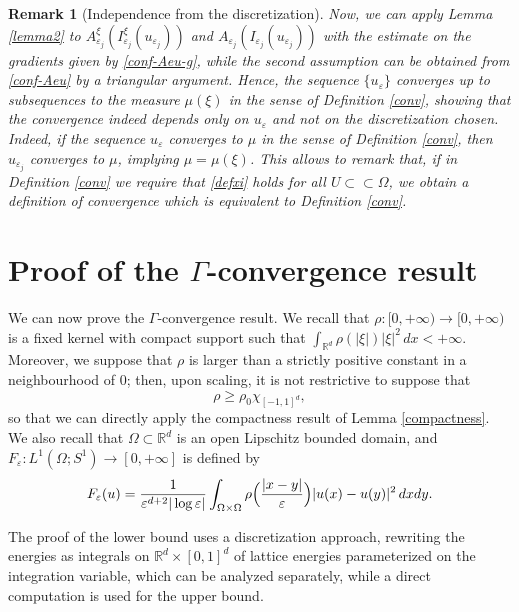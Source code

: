 \documentclass[11pt]{article}
\newtheorem{remark}[definition]{Remark}
\def\e{\varepsilon}
\def\dxy{\,dx dy}
\begin{document}
\begin{remark}[Independence from the discretization]
Now, we can apply Lemma \ref{lemma2} to $A^\xi_{\e_j}(I_{\e_j}^\xi(u_{\e_j}))$ and $A_{\e_j}(I_{\e_j}(u_{\e_j}))$ with the estimate on the gradients given by \eqref{conf-Aeu-g}, while the second assumption can be obtained from \eqref{conf-Aeu} by a triangular argument. 
Hence, the sequence $\{u_\e\}$ converges up to subsequences to the measure $\mu(\xi)$ in the sense of Definition \ref{conv},  
showing that the convergence indeed depends only on $u_\e$ and not on the discretization chosen.
Indeed, if the sequence $u_\e$ converges to $\mu$ in the sense of Definition \ref{conv}, 
then $u_{\e_j}$ converges to $\mu$, implying $\mu=\mu(\xi)$. 
This allows to remark that, if in Definition \ref{conv} we require that \eqref{defxi} holds 
for all $U\subset\subset\Omega$, 
we obtain a definition of convergence which is equivalent to Definition \ref{conv}. 
\end{remark}

\goodbreak
\section{Proof of the $\Gamma$-convergence result}\label{conv-sec} 
We can now prove the $\Gamma$-convergence result. We recall that 
$\rho\colon[0,+\infty)\to[0,+\infty)$ is a fixed kernel with compact support such that 
$\int_{\mathbb R^d}\rho(|\xi|)|\xi|^2\, dx<+\infty$. 
Moreover, we suppose that $\rho$ is larger than a strictly positive constant in a neighbourhood of $0$; then, upon scaling, it is not restrictive to suppose that \begin{equation}\label{ipotesi-rho}
\rho\geq \rho_0\chi_{[-1,1]^d} ,
\end{equation}
so that we can directly apply the compactness result of Lemma \ref{compactness}.  
We also recall that $\Omega\subset\mathbb R^d$ is an open Lipschitz bounded domain, and  $F_\e\colon L^1(\Omega; S^1)\to [0,+\infty]$ is defined by 
\begin{equation*}
F_\e(u)=
{1\over\e^{d+2}|\log\e|} \int_{\Omega\times\Omega}\rho\Bigl({|x-y|\over\e}\Bigr) {|u(x)-u(y)|^2}\dxy.
\end{equation*}

The proof of the lower bound uses a discretization approach, rewriting the energies as integrals on $\mathbb R^d\times [0,1]^d$ of lattice energies parameterized on the integration variable, which can be analyzed separately, while a direct computation is used for the upper bound. 
 
\end{document}
